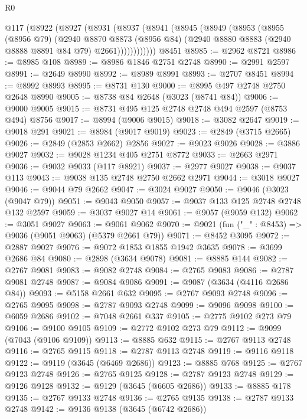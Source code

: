 \begin{lexlean}{R0}
\begin{coremodule}
    @117
      (@8922
        (@8927
          (@8931
            (@8937
              (@8941
                (@8945
                  (@8949
                    (@8953
                      (@8955
                        (@8956 @79)
                        (@2940
                          @8870
                          @8873
                          (@8956 @84)
                          (@2940 @8880 @8883 (@2940 @8888 @8891 @84 @79) @2661))))))))))))
    @8451
@8985 := @2962 @8721
@8986 := @8985 @108
@8989 := @8986 @1846 @2751 @2748
@8990 := @2991 @2597
@8991 := @2649 @8990
@8992 := @8989 @8991
@8993 := @2707 @8451
@8994 := @8992 @8993
@8995 := @8731 @130
@9000 := @8995 @497 @2748 @2750 @2648 @8990
@9005 := @8738 @84 @2648 (@3023 (@8741 @84))
@9006 := @9000 @9005
@9015 := @8731 @495 @125 @2748 @2748 @494 @2597 (@8753 @494) @8756
@9017 := @8994 (@9006 @9015)
@9018 := @3082 @2647
@9019 := @9018 @291
@9021 := @8984 (@9017 @9019)
@9023 := @2849 (@3715 @2665)
@9026 := @2849 (@2853 @2662) @2856
@9027 := @9023 @9026
@9028 := @3886 @9027
@9032 := @9028 @1234 @405 @2751 @8772
@9033 := @2663 @2971
@9036 := @9032 @9033 (@117 @8921)
@9037 := @2977 @9027
@9038 := @9037 @113
@9043 := @9038 @135 @2748 @2750 @2662 @2971
@9044 := @3018 @9027
@9046 := @9044 @79 @2662
@9047 := @3024 @9027
@9050 := @9046 (@3023 (@9047 @79))
@9051 := @9043 @9050
@9057 := @9037 @133 @125 @2748 @2748 @132 @2597
@9059 := @3037 @9027 @14
@9061 := @9057 (@9059 @132)
@9062 := @3051 @9027
@9063 := @9061 @9062
@9070 := @9021 (fun ("_" : @8453) => @9036 (@9051 @9063) (@5379 @2661 @79))
@9071 := @8452 @3095
@9072 := @2887 @9027
@9076 := @9072 @1853 @1855 @1942 @3635
@9078 := @3699 @2686 @84
@9080 := @2898 (@3634 @9078)
@9081 := @8885 @144
@9082 := @2767 @9081
@9083 := @9082 @2748
@9084 := @2765 @9083
@9086 := @2787 @9081 @2748
@9087 := @9084 @9086
@9091 := @9087 (@3634 (@4116 @2686 @84))
@9093 := @5158 @2661 @632
@9095 := @2767 @9093 @2748
@9096 := @2765 @9095
@9098 := @2787 @9093 @2748
@9099 := @9096 @9098
@9100 := @6059 @2686
@9102 := @7048 @2661 @337
@9105 := @2775 @9102 @273 @79
@9106 := @9100 @9105
@9109 := @2772 @9102 @273 @79
@9112 := @9099 (@7043 (@9106 @9109))
@9113 := @8885 @632
@9115 := @2767 @9113 @2748
@9116 := @2765 @9115
@9118 := @2787 @9113 @2748
@9119 := @9116 @9118
@9122 := @9119 (@3645 (@6469 @2686))
@9123 := @8885 @768
@9125 := @2767 @9123 @2748
@9126 := @2765 @9125
@9128 := @2787 @9123 @2748
@9129 := @9126 @9128
@9132 := @9129 (@3645 (@6605 @2686))
@9133 := @8885 @178
@9135 := @2767 @9133 @2748
@9136 := @2765 @9135
@9138 := @2787 @9133 @2748
@9142 := @9136 @9138 (@3645 (@6742 @2686))

\end{coremodule}
\end{lexlean}
